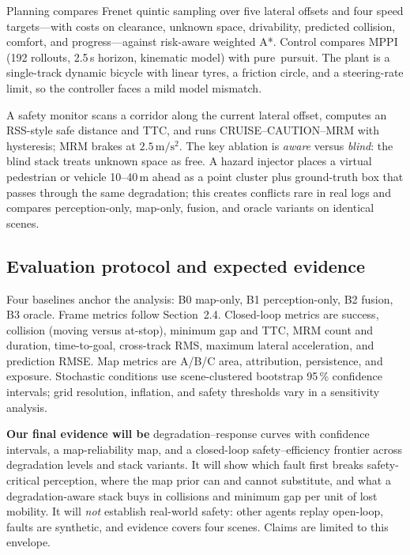 \documentclass[10pt,a4paper]{article}
\begin{document}
Planning compares Frenet quintic sampling over five lateral offsets and four speed targets---with costs on clearance, unknown space, drivability, predicted collision, comfort, and progress---against risk-aware weighted A*. Control compares MPPI (192 rollouts, 2.5\,s horizon, kinematic model) with \mbox{pure pursuit}. The plant is a single-track dynamic bicycle with linear tyres, a friction circle, and a steering-rate limit, so the controller faces a mild model mismatch.

A safety monitor scans a corridor along the current lateral offset, computes an RSS-style safe distance and TTC, and runs CRUISE--CAUTION--MRM with hysteresis; MRM brakes at $2.5\,\mathrm{m/s^2}$. The key ablation is \emph{aware} versus \emph{blind}: the blind stack treats unknown space as free. A hazard injector places a virtual pedestrian or vehicle 10--40\,m ahead as a point cluster plus ground-truth box that passes through the same degradation; this creates conflicts rare in real logs and compares perception-only, map-only, fusion, and oracle variants on identical scenes.

\subsection{Evaluation protocol and expected evidence}

Four baselines anchor the analysis: B0 map-only, B1 perception-only, B2 fusion, B3 oracle. Frame metrics follow Section~2.4. Closed-loop metrics are success, collision (moving versus at-stop), minimum gap and TTC, MRM count and duration, time-to-goal, cross-track RMS, maximum lateral acceleration, and prediction RMSE. Map metrics are A/B/C area, attribution, persistence, and exposure. Stochastic conditions use scene-clustered bootstrap 95\,\% confidence intervals; grid resolution, inflation, and safety thresholds vary in a sensitivity analysis.

\textbf{Our final evidence will be} degradation--response curves with confidence intervals, a map-reliability map, and a closed-loop safety--efficiency frontier across degradation levels and stack variants. It will show which fault first breaks safety-critical perception, where the map prior can and cannot substitute, and what a degradation-aware stack buys in collisions and minimum gap per unit of lost mobility. It will \emph{not} establish real-world safety: other agents replay open-loop, faults are synthetic, and evidence covers four scenes. Claims are limited to this envelope.
\end{document}
